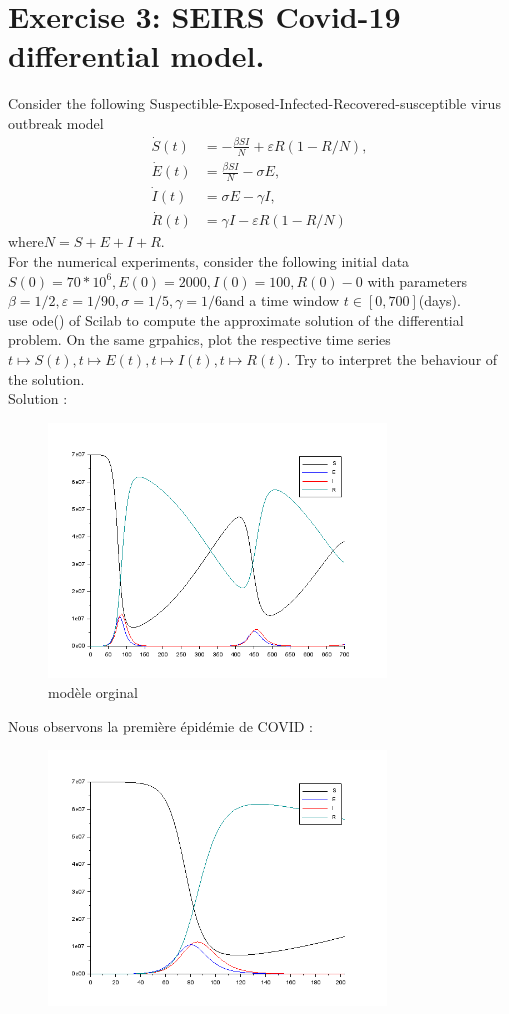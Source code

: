 \documentclass[11pt]{article}
\begin{document}
    \section*{Exercise 3: SEIRS Covid-19 differential model.}
    Consider the following Suspectible-Exposed-Infected-Recovered-susceptible virus outbreak model
    \begin{align*}
        \dot{S}(t)&=-\frac{\beta SI}{N} + \varepsilon R(1-R/N),\\
        \dot{E}(t)&=\frac{\beta SI}{N} -\sigma E,\\
        \dot{I}(t)&=\sigma E - \gamma I,\\
        \dot{R}(t)&=\gamma I - \varepsilon R(1-R/N)
    \end{align*}
    where$N=S+E+I+R$.\\
    For the numerical experiments, consider the following initial data $S(0)=70*10^6,E(0)=2000,I(0)=100,R(0)-0$ with parameters$\beta=1/2,\varepsilon=1/90,\sigma=1/5,\gamma=1/6$and a time window $t\in[0,700]$(days).\\
    use ode() of Scilab to compute the approximate solution of the differential problem. On the same grpahics, plot the respective time series $t\mapsto S(t),t\mapsto E(t),t\mapsto I(t),t\mapsto R(t)$. Try to interpret the behaviour of the solution.
    ~\\
    Solution :
    \begin{figure}[H]
        \centering
        \includegraphics[width=0.8\textwidth,height=0.5\textwidth]{E3_1}
        \caption{modèle orginal}
    \end{figure}
    Nous observons la première épidémie de COVID :
    \begin{figure}[H]
        \centering
        \includegraphics[width=0.8\textwidth,height=0.5\textwidth]{E3_2}
    \end{figure}
\end{document}
